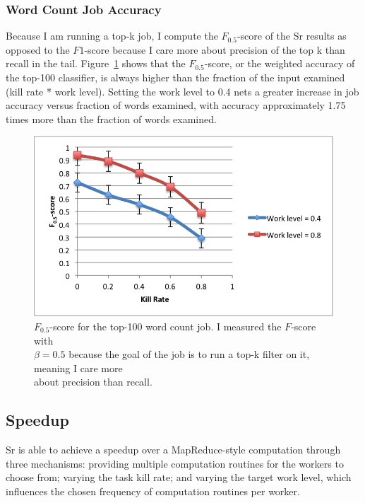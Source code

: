 \documentclass[12pt]{article}
\begin{document}
\subsubsection{Word Count Job Accuracy}
Because I am running a top-k job, I compute the $F_{0.5}$-score of the Sr results as
opposed to the $F1$-score because I care more about precision of the top k than recall
in the tail. Figure~\ref{fig:fscore} shows that the $F_{0.5}$-score, or the weighted
accuracy of the top-100 classifier, is always higher than the fraction of the input
examined (kill rate * work level). Setting the work level to 0.4 nets a greater increase
in job accuracy versus fraction of words examined, with accuracy approximately 1.75 times
more than the fraction of words examined.

\begin{figure}
\includegraphics[width=\linewidth]{f-score.png}
\caption{$F_{0.5}$-score for the top-100 word count job. I measured the $F$-score with\\
$\beta=0.5$ because the goal of the job is to run a top-k filter on it, meaning I care more\\
about precision than recall.}
\label{fig:fscore}
\end{figure}

\subsection{Speedup}
Sr is able to achieve a speedup over a MapReduce-style computation through three mechanisms:
providing multiple computation routines for the workers to choose from; varying the task kill
rate; and varying the target work level, which influences the chosen frequency of computation
routines per worker.
\end{document}
